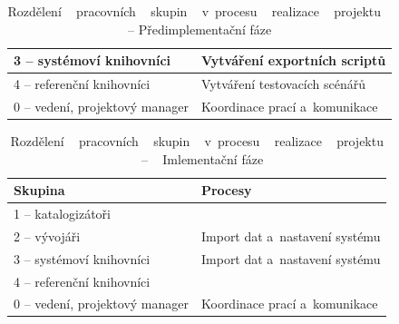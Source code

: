 \documentclass[
	11pt, oneside, printed, final, palatino
	microtype,
	table,   %
	lof,     %
	lot     %
]{fithesis3}
\newcommand{\bold}[1]{\textbf{#1}}
\begin{document}
{\begin{table}
\begin{tabular}{| p{3cm} | p{8.3cm} |}
	3 – systémoví knihovníci
    & 
    Vytváření exportních scriptů
    \\ \hline
    
	4 – referenční knihovníci
    & 
    Vytváření testovacích scénářů
    \\ \hline
    
	0 – vedení, projektový manager
    & 
    Koordinace prací a~komunikace
    \\ \hline
    
    \end{tabular}
    \caption{Rozdělení ~ pracovních ~  skupin ~  v~procesu ~  realizace ~  projektu ~ – Předimplementační fáze}
\end{table}
    
\begin{table}
    \centering
    \begin{tabular}{| p{3cm} | p{8.3cm} |}
    \hline
    \bold{Skupina} 	
    & 
    \bold{Procesy} 
    \\ \hline
    
	1 – katalogizátoři
    & 
    
    \\ \hline
    
	2 – vývojáři
    & 
    Import dat a~nastavení systému
    \\ \hline
    
	3 – systémoví knihovníci
    & 
    Import dat a~nastavení systému
    \\ \hline
    
	4 – referenční knihovníci
    & 
    
    \\ \hline
    
	0 – vedení, projektový manager
    & 
    Koordinace prací a~komunikace
    \\ \hline
    
    \end{tabular}
    \caption{Rozdělení ~ pracovních ~  skupin ~  v~procesu ~  realizace ~  projektu ~ – ~ Imlementační fáze}
\end{table}

}
\end{document}
